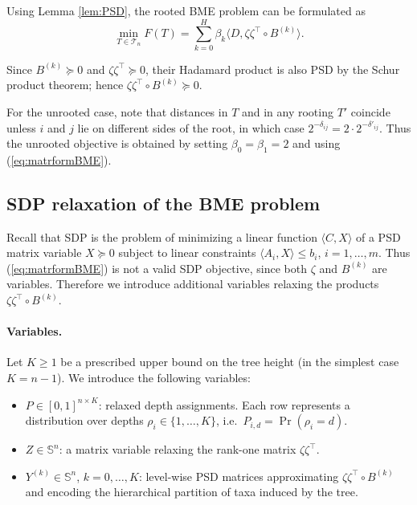 \documentclass{article}
\begin{document}
Using Lemma \ref{lem:PSD}, the rooted BME problem can be formulated as
\begin{equation}\label{eq:matrformBME}
\min_{T\in \mathcal{T}_n} F(T)
= \sum_{k=0}^H \beta_k\langle D,\zeta\zeta^{\top}\circ B^{(k)} \rangle .
\end{equation}

\noindent
Since $B^{(k)}\succeq0$ and $\zeta\zeta^{\top}\succeq0$,
their Hadamard product is also PSD by the
Schur product theorem; hence
$\zeta\zeta^{\top}\circ B^{(k)}\succeq0$.

For the unrooted case, note that distances in $T$ and in any rooting $T'$
coincide unless $i$ and $j$ lie on different sides of the root,
in which case $2^{-\delta_{ij}}=2\cdot2^{-\delta'_{ij}}$.
Thus the unrooted objective is obtained by setting
$\beta_0 = \beta_1 =2$ and using (\ref{eq:matrformBME}).

\subsection{SDP relaxation of the BME problem}

Recall that SDP is the problem of minimizing a linear function
$\langle C,X\rangle$ of a PSD matrix variable $X\succeq0$
subject to linear constraints $\langle A_i,X\rangle\le b_i$,
$i=1,\dots,m$. Thus (\ref{eq:matrformBME}) is not a valid SDP
objective, since both $\zeta$ and $B^{(k)}$ are variables.
Therefore we introduce additional variables relaxing the products $\zeta\zeta^{\top}\circ B^{(k)}$.

\paragraph{Variables.}

Let $K\ge1$ be a prescribed upper bound on the tree height
(in the simplest case $K=n-1$). We introduce the following variables:

\begin{itemize}
\item $P\in[0,1]^{n\times K}$: relaxed depth assignments.
Each row represents a distribution over depths
$\rho_i\in\{1,\dots,K\}$, i.e.\ $P_{i,d}=\Pr(\rho_i=d)$.

\item $Z\in\mathbb{S}^n$: a matrix variable relaxing
the rank-one matrix $\zeta\zeta^{\top}$.

\item $Y^{(k)}\in\mathbb{S}^n$, $k=0,\dots,K$:
level-wise PSD matrices approximating
$\zeta\zeta^{\top}\circ B^{(k)}$ and encoding the
hierarchical partition of taxa induced by the tree.
\end{itemize}
\end{document}
